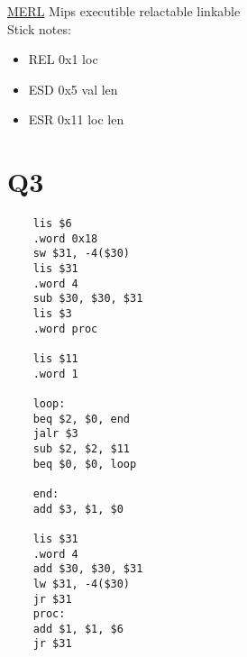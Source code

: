\documentclass[12pt]{article}
\begin{document}
	\underline{MERL} Mips executible relactable linkable\\
	Stick notes:
	\begin{itemize}
		\item REL 0x1 loc
		\item ESD 0x5 val len
		\item ESR 0x11 loc len
	\end{itemize}
	
	
	\section*{Q3}
	\begin{verbatim}
	lis $6
	.word 0x18
	sw $31, -4($30)
	lis $31
	.word 4
	sub $30, $30, $31
	lis $3
	.word proc
	
	lis $11
	.word 1
	
	loop:
	beq $2, $0, end
	jalr $3
	sub $2, $2, $11
	beq $0, $0, loop
	
	end:
	add $3, $1, $0
	
	lis $31
	.word 4
	add $30, $30, $31
	lw $31, -4($30)
	jr $31
	proc:
	add $1, $1, $6
	jr $31
	\end{verbatim}
	
\end{document}

